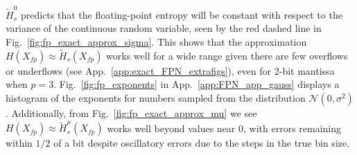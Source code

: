 \documentclass[12pt,onecolumn, margin=1in]{IEEEtran}
\newcommand{\Ht}{\tilde{H}}
\begin{document}
$\Ht^0_s$ predicts that the floating-point entropy will be constant with respect to the variance of the continuous random variable, seen by the red dashed line in Fig.~\ref{fig:fp_exact_approx_sigma}. This shows that the approximation $H(X_{fp}) \approx \tilde H_s(X_{fp})$ works well for a wide range given there are few overflows or underflows (see App.~\ref{app:exact_FPN_extrafigs}), even for 2-bit mantissa when $p=3$. Fig.~\ref{fig:fp_exponents} in App.~\ref{app:FPN_app_gauss} displays a histogram of the exponents for numbers sampled from the distribution $\mathcal{N}(0,\sigma^2)$. Additionally, from Fig.~\ref{fig:fp_exact_approx_mu} we see $H(X_{fp}) \approx \tilde H^\mu_s(X_{fp})$ works well beyond values near 0, with errors remaining within $1/2$ of a bit despite oscillatory errors due to the steps in the true bin size.
\end{document}
